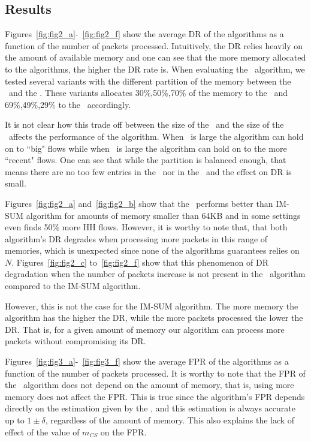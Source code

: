 \subsection{Results}



Figures~\ref{fig:fig2_a}-~\ref{fig:fig2_f} show the average DR of the algorithms as a function of the number of packets processed. Intuitively, the DR relies heavily on the amount of available memory and one can see that the more memory allocated to the algorithms, the higher the DR rate is. When evaluating the \cs\ algorithm, we tested several variants with the different partition of the memory between the \cs\ and the \sfa. These variants allocates 30\%,50\%,70\% of the memory to the \cs\ and 69\%,49\%,29\% to the \sfa\ accordingly.

It is not clear how this trade off between the size of the \cs\ and the size of the \sfa\ affects the performance of the algorithm. When \cs\ is large the algorithm can hold on to ``big" flows while when  \sfa\ is large the algorithm can hold on to the more ``recent" flows. One can see that while the partition is balanced enough, that means there are no too few entries in the \sfa\ nor in the \cs\ and the effect on DR is small.

Figures~\ref{fig:fig2_a} and~\ref{fig:fig2_b} show that the \cs\ performs better than IM-SUM algorithm for amounts of memory smaller than 64KB and in some settings even finds 50\% more HH flows. However, it is worthy to note that, that both algorithm's DR degrades when processing more packets in this range of memories, which is unexpected since none of the algorithms guarantees relies on $N$.
Figures~\ref{fig:fig2_c} to~\ref{fig:fig2_f} show that this phenomenon of DR degradation when the number of packets increase is not present in the \cs\ algorithm compared to the IM-SUM algorithm.

However, this is not the case for the IM-SUM algorithm. The more memory the algorithm has the higher the DR, while the more packets processed the lower the DR. That is, for a given amount of memory our algorithm can process more packets without compromising its DR.



Figures~\ref{fig:fig3_a}-~\ref{fig:fig3_f} show the average FPR of the algorithms as a function of the number of packets processed. It is worthy to note that the FPR of the \cs\ algorithm does not depend on the amount of memory, that is, using more memory does not affect the FPR. This is true since the algorithm's FPR depends directly on the estimation given by the \sea, and this estimation is always accurate up to $1\pm \delta$, regardless of the amount of memory. This also explains the lack of effect of the value of $m_{CS}$ on the FPR.

